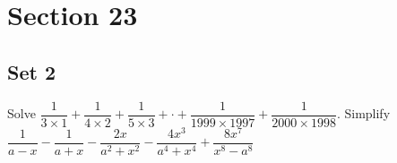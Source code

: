 \documentclass[11pt,a4paper,twoside,UTF8]{exam}
\begin{document}
\section*{Section 23}
\subsection*{Set 2}
\begin{questions}
	\question
	Solve $\dfrac{1}{3 \times 1} + \dfrac{1}{4 \times 2} + \dfrac{1}{5 \times 3} + \cdot + \dfrac{1}{1999 \times 1997} + \dfrac{1}{2000 \times 1998}$.
	\setcounter{question}{3}
	\question
	Simplify $\dfrac{1}{a - x} - \dfrac{1}{a + x} - \dfrac{2x}{a^2 + x^2} - \dfrac{4x^3}{a^4 + x^4} + \dfrac{8x^7}{x^8 - a^8}$
\end{questions}
\end{document}

